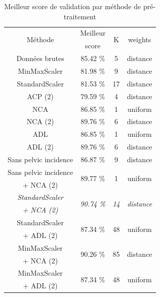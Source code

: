 \documentclass[twocolumn,10pt]{article}
\begin{document}
\begin{table}[htbp]
    \begin{center}
        \caption{\label{tab:accuracy_KNN}Meilleur score de validation par méthode de pré-traitement}
        \begin{tabular}{c|ccc}
            \multirow{2}{*}{Méthode} & Meilleur & \multirow{2}{*}{K} & \multirow{2}{*}{weights} \\
            & score & \\
            \hline
            Données brutes & 85.42 \% & 5 & distance \\
            MinMaxScaler & 81.98 \% &  9 & distance\\
            StandardScaler & 81.53 \% &  17 & distance\\
            ACP (2) & 79.59 \% & 4 & distance \\
            NCA & 86.85 \% & 1 & uniform\\
            NCA (2) & 89.76 \% & 6 & distance\\
            ADL & 86.85 \% & 1 & uniform\\
            ADL (2) & 89.76 \% & 6 & distance\\
            Sans pelvic incidence & 86.87 \% & 9 & distance \\ \hline
            Sans pelvic incidence  &  \multirow{2}{*}{89.77 \%} & \multirow{2}{*}{1} & \multirow{2}{*}{uniform}\\
            + NCA (2) & & \\ 
            \textit{StandardScaler}  &  \multirow{2}{*}{\textit{90.74 \%}} & \multirow{2}{*}{\textit{14}} & \multirow{2}{*}{\textit{distance}}\\
            \textit{+ NCA (2)} & & \\
            StandardScaler  &  \multirow{2}{*}{87.34 \%} & \multirow{2}{*}{48} & \multirow{2}{*}{uniform}\\
            + ADL (2) & & \\ 
            MinMaxScaler  &  \multirow{2}{*}{90.26 \%} & \multirow{2}{*}{85} & \multirow{2}{*}{distance}\\
            + NCA (2) & & \\ 
            MinMaxScaler  &  \multirow{2}{*}{87.34 \%} & \multirow{2}{*}{48} & \multirow{2}{*}{uniform}\\
            + ADL (2) & & \\ 

        \end{tabular}
    \end{center}
\end{table}
\end{document}
